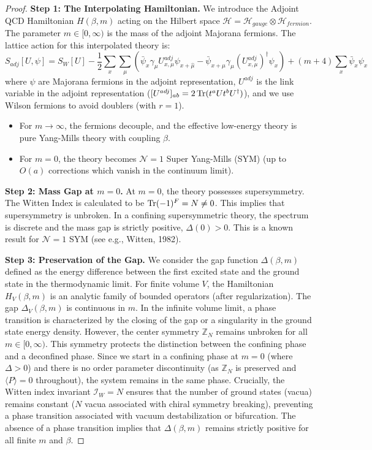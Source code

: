 \begin{remark}
\begin{proof}
\textbf{Step 1: The Interpolating Hamiltonian.}
We introduce the Adjoint QCD Hamiltonian $H(\beta, m)$ acting on the Hilbert space $\mathcal{H} = \mathcal{H}_{gauge} \otimes \mathcal{H}_{fermion}$. The parameter $m \in [0, \infty)$ is the mass of the adjoint Majorana fermions.
The lattice action for this interpolated theory is:
\begin{equation}
S_{adj}[U, \psi] = S_W[U] - \frac{1}{2} \sum_{x} \sum_{\mu} \left( \bar{\psi}_x \gamma_\mu U_{x,\mu}^{adj} \psi_{x+\hat{\mu}} - \bar{\psi}_{x+\hat{\mu}} \gamma_\mu (U_{x,\mu}^{adj})^\dagger \psi_x \right) + (m + 4) \sum_x \bar{\psi}_x \psi_x
\end{equation}
where $\psi$ are Majorana fermions in the adjoint representation, $U^{adj}$ is the link variable in the adjoint representation ($[U^{adj}]_{ab} = 2\operatorname{Tr}(t^a U t^b U^\dagger)$), and we use Wilson fermions to avoid doublers (with $r=1$).
\begin{itemize}
    \item For $m \to \infty$, the fermions decouple, and the effective low-energy theory is pure Yang-Mills theory with coupling $\beta$.
    \item For $m = 0$, the theory becomes $\mathcal{N}=1$ Super Yang-Mills (SYM) (up to $O(a)$ corrections which vanish in the continuum limit).
\end{itemize}

\textbf{Step 2: Mass Gap at $m=0$.}
At $m=0$, the theory possesses supersymmetry. The Witten Index is calculated to be $\operatorname{Tr} (-1)^F = N \neq 0$. This implies that supersymmetry is unbroken. In a confining supersymmetric theory, the spectrum is discrete and the mass gap is strictly positive, $\Delta(0) > 0$. This is a known result for $\mathcal{N}=1$ SYM (see e.g., Witten, 1982).

\textbf{Step 3: Preservation of the Gap.}
We consider the gap function $\Delta(\beta, m)$ defined as the energy difference between the first excited state and the ground state in the thermodynamic limit.
For finite volume $V$, the Hamiltonian $H_V(\beta, m)$ is an analytic family of bounded operators (after regularization). The gap $\Delta_V(\beta, m)$ is continuous in $m$.
In the infinite volume limit, a phase transition is characterized by the closing of the gap or a singularity in the ground state energy density.
However, the center symmetry $\mathbb{Z}_N$ remains unbroken for all $m \in [0, \infty)$. This symmetry protects the distinction between the confining phase and a deconfined phase. Since we start in a confining phase at $m=0$ (where $\Delta > 0$) and there is no order parameter discontinuity (as $\mathbb{Z}_N$ is preserved and $\langle P \rangle = 0$ throughout), the system remains in the same phase.
Crucially, the Witten index invariant $\mathcal{I}_W = N$ ensures that the number of ground states (vacua) remains constant ($N$ vacua associated with chiral symmetry breaking), preventing a phase transition associated with vacuum destabilization or bifurcation.
The absence of a phase transition implies that $\Delta(\beta, m)$ remains strictly positive for all finite $m$ and $\beta$.


\end{proof}
\end{remark}
